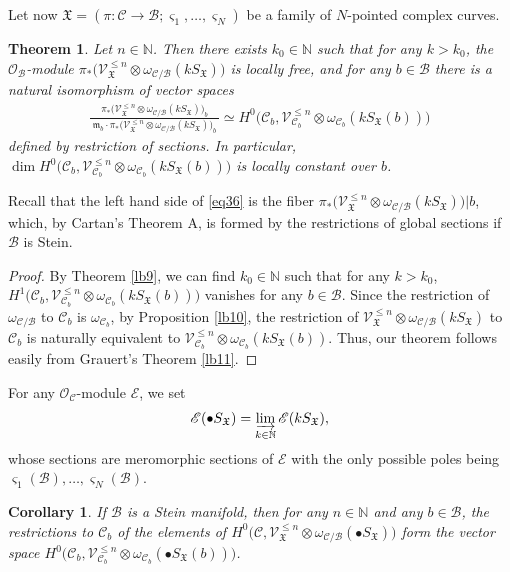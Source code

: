 \documentclass[12pt,a4paper,notitlepage]{article}
\theoremstyle{definition}
\theoremstyle{plain}
\newtheorem{thm}[df]{Theorem}
\newtheorem{co}[df]{Corollary}
\newcommand{\fk}{\mathfrak}
\newcommand{\mc}{\mathcal}
\newcommand{\scr}{\mathscr}
\newcommand{\sgm}{\varsigma}
\newcommand{\SX}{S_{\fk X}}
\newcommand{\mbb}{\mathbb}
\newcommand{\blt}{\bullet}
\newcommand{\Nbb}{\mathbb N}
\numberwithin{equation}{section}
\begin{document}
Let now $\fk X=(\pi:\mc C\rightarrow\mc B;\sgm_1,\dots,\sgm_N)$ be a family of $N$-pointed complex curves.

\begin{thm}\label{lb8}
Let $n\in\Nbb$. Then  there exists $k_0\in\mbb N$ such that for any $k>k_0$, the $\scr O_{\mc B}$-module  $\pi_*\big(\scr V_{\fk X}^{\leq n}\otimes\omega_{\mc C/\mc B}(k\SX)\big)$ is locally free, and for any $b\in\mc B$ there is a natural isomorphism of vector spaces
\begin{align}
	\frac{\pi_*\big(\scr V_{\fk X}^{\leq n}\otimes\omega_{\mc C/\mc B}(k\SX)\big)_b}{~\fk m_b\cdot\pi_*\big(\scr V_{\fk X}^{\leq n}\otimes\omega_{\mc C/\mc B}(k\SX)\big)_b~}\simeq H^0\big(\mc C_b,\scr V_{\mc C_b}^{\leq n}\otimes\omega_{\mc C_b}(k\SX(b))\big)\label{eq36}
\end{align} 
defined by  restriction of sections. In particular,  $\dim  H^0\big(\mc C_b,\scr V_{\mc C_b}^{\leq n}\otimes\omega_{\mc C_b}(k\SX(b))\big)$ is locally constant over $b$.
\end{thm}

Recall that the left hand side of \eqref{eq36} is the fiber $\pi_*\big(\scr V_{\fk X}^{\leq n}\otimes\omega_{\mc C/\mc B}(k\SX)\big)\big|b$, which, by Cartan's Theorem A, is formed by the restrictions of global sections if $\mc B$ is Stein.

\begin{proof}
By Theorem \ref{lb9}, we can find $k_0\in\Nbb$ such that for any $k>k_0$, $H^1\big(\mc C_b,\scr V_{\mc C_b}^{\leq n}\otimes\omega_{\mc C_b}(k\SX(b))\big)$ vanishes for any $b\in\mc B$. Since the restriction of $\omega_{\mc C/\mc B}$ to $\mc C_b$ is $\omega_{\mc C_b}$, by Proposition \ref{lb10}, the restriction of $\scr V_{\fk X}^{\leq n}\otimes\omega_{\mc C/\mc B}(k\SX)$ to $\mc C_b$ is naturally equivalent to $\scr V_{\mc C_b}^{\leq n}\otimes\omega_{\mc C_b}(k\SX(b))$.  Thus, our theorem follows easily from Grauert's Theorem \ref{lb11}.
\end{proof}


For any $\scr O_{\mc C}$-module $\scr E$, we \index{SX@$\blt\SX$} set
\begin{align*}
\scr E(\blt\SX)=\varinjlim_{k\in\Nbb}\scr E(k\SX),
\end{align*}
whose sections are meromorphic sections of $\scr E$ with the only possible poles being $\sgm_1(\mc B),\dots,\sgm_N(\mc B)$.


\begin{co}\label{lb16}
If $\mc B$ is a Stein manifold, then for any $n\in\Nbb$ and any $b\in \mc B$, the restrictions to $\mc C_b$ of the elements of $H^0\big(\mc C,\scr V_{\fk X}^{\leq n}\otimes\omega_{\mc C/\mc B}(\blt\SX)\big)$  form the vector space $H^0\big(\mc C_b,\scr V_{\mc C_b}^{\leq n}\otimes\omega_{\mc C_b}(\blt\SX(b))\big)$.
\end{co}
\end{document}
